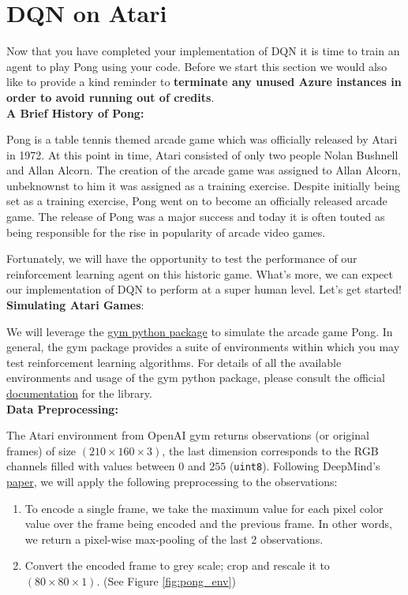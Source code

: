 \section{DQN on Atari}

Now that you have completed your implementation of DQN it is time to train an agent to play Pong using your code. Before we start this section we would also like to provide a kind reminder to \textbf{terminate any unused Azure instances in order to avoid running out of credits}. \\

\textbf{A Brief History of Pong:}

Pong is a table tennis themed arcade game which was officially released by Atari in 1972. At this point in time, Atari consisted of only two people Nolan Bushnell and Allan Alcorn. The creation of the arcade game was assigned to Allan Alcorn, unbeknownst to him it was assigned as a training exercise. Despite initially being set as a training exercise, Pong went on to become an officially released arcade game. The release of Pong was a major success and today it is often touted as being responsible for the rise in popularity of arcade video games.

Fortunately, we will have the opportunity to test the performance of our reinforcement learning agent on this historic game. What's more, we can expect our implementation of DQN to perform at a super human level. Let's get started! \\

\textbf{Simulating Atari Games}:

We will leverage the \href{https://www.gymlibrary.dev/}{gym python package} to simulate the arcade game Pong. In general, the gym package provides a suite of environments within which you may test reinforcement learning algorithms. For details of all the available environments and usage of the gym python package, please consult the official \href{https://www.gymlibrary.dev/}{documentation} for the library. \\

\textbf{Data Preprocessing:}

The Atari environment from OpenAI gym returns observations (or original frames) of size $ (210 \times 160 \times 3) $, the last dimension corresponds to the RGB channels filled with values between $ 0 $ and $ 255 $ (\texttt{uint8}). Following DeepMind's \href{https://storage.googleapis.com/deepmind-media/dqn/DQNNaturePaper.pdf}{paper}, we will apply the following preprocessing to the observations:
\begin{enumerate}[1.]
\item To encode a single frame, we take the maximum value for each pixel color value over the frame being encoded and the previous frame. In other words, we return a pixel-wise max-pooling of the last 2 observations.
\item Convert the encoded frame to grey scale; crop and rescale it to $(80 \times 80 \times 1)$. (See Figure \ref{fig:pong_env})
\end{enumerate}

